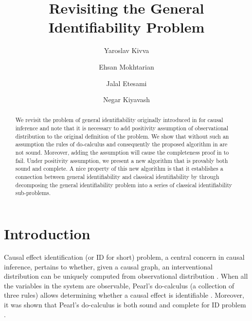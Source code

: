 \documentclass[accepted]{uai2022}
\title{Revisiting the General Identifiability Problem}
\author[1]{Yaroslav Kivva}
\author[1]{Ehsan Mokhtarian}
\author[1]{Jalal Etesami}
\author[1,2]{Negar Kiyavash}
\affil[1]{%
    School of Computer and Communication Sciences\\
    EPFL\\
    Lausanne, Switzerland
}
\affil[2]{%
    College of Management of Technology\\
    EPFL\\
    Lausanne, Switzerland
}
\begin{document}
\maketitle

\begin{abstract}
    We revisit the problem of general identifiability originally introduced in \citep{lee2019general} for causal inference and note that it is necessary to add positivity assumption of observational distribution to the original definition of the problem. We show that without such an assumption the rules of do-calculus and consequently the proposed algorithm in \citep{lee2019general} are not sound. Moreover, adding the assumption will cause the completeness proof in \citep{lee2019general} to fail. Under positivity assumption, we present a new algorithm that is provably both sound and complete. A nice property of this new algorithm is that it establishes a connection between  general identifiability and classical identifiability by \cite{pearl1995causal} through decomposing the general identifiability problem into a series of classical identifiability  sub-problems.
\end{abstract}


\section{Introduction}
    Causal effect identification (or {ID} for short) problem, a central concern in causal inference, pertains to whether, given a causal graph, an interventional distribution can be uniquely computed from observational distribution \citep{pearl2009causality}.
    When all the variables in the system are observable, Pearl's do-calculus (a collection of three rules) allows determining whether a causal effect is identifiable  \citep{pearl1995causal}.
    Moreover, it was shown that Pearl's do-calculus is both sound and complete for ID problem \citep{shpitser2006identification, huang2008completeness}.
    
\end{document}
